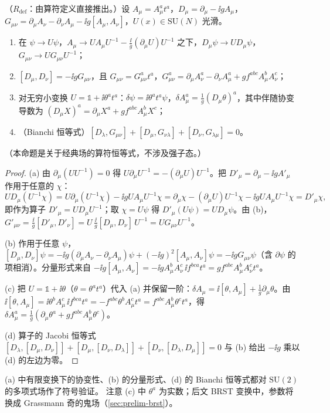 \begin{proposition}\label{prop:qcd-covariance}
（$R_{\mathrm{def}}$：由算符定义直接推出。）设 $A_\mu=A^a_\mu t^a$，$D_\mu=\partial_\mu-\ii gA_\mu$，$G_{\mu\nu}=\partial_\mu A_\nu-\partial_\nu A_\mu-\ii g[A_\mu,A_\nu]$，$U(x)\in\mathrm{SU}(N)$ 光滑。%
\begin{enumerate}[label=(\alph*),leftmargin=2.2em,itemsep=1pt,topsep=2pt]
\item 在 $\psi\to U\psi$，$A_\mu\to UA_\mu U^{-1}-\frac{\ii}g(\partial_\mu U)U^{-1}$ 之下，$D_\mu\psi\to UD_\mu\psi$，$G_{\mu\nu}\to UG_{\mu\nu}U^{-1}$；
\item $[D_\mu,D_\nu]=-\ii gG_{\mu\nu}$，且 $G_{\mu\nu}=G^a_{\mu\nu}t^a$，$G^a_{\mu\nu}=\partial_\mu A^a_\nu-\partial_\nu A^a_\mu+gf^{abc}A^b_\mu A^c_\nu$；
\item 对无穷小变换 $U=\mathbb 1+\ii\theta^at^a$：$\delta\psi=\ii\theta^at^a\psi$，$\delta A^a_\mu=\frac1g(D_\mu\theta)^a$，其中伴随协变导数为 $(D_\mu X)^a=\partial_\mu X^a+gf^{abc}A^b_\mu X^c$；
\item（Bianchi 恒等式）$[D_\lambda,G_{\mu\nu}]+[D_\mu,G_{\nu\lambda}]+[D_\nu,G_{\lambda\mu}]=0$。
\end{enumerate}
（本命题是关于经典场的算符恒等式，不涉及强子态。）
\end{proposition}

\begin{proof}
(a) 由 $\partial_\mu(UU^{-1})=0$ 得 $U\partial_\mu U^{-1}=-(\partial_\mu U)U^{-1}$。把 $D'_\mu=\partial_\mu-\ii gA'_\mu$ 作用于任意的 $\chi$：
\[
UD_\mu(U^{-1}\chi)=U\partial_\mu(U^{-1}\chi)-\ii gUA_\mu U^{-1}\chi=\partial_\mu\chi-(\partial_\mu U)U^{-1}\chi-\ii gUA_\mu U^{-1}\chi=D'_\mu\chi ,
\]
即作为算子 $D'_\mu=UD_\mu U^{-1}$；取 $\chi=U\psi$ 得 $D'_\mu(U\psi)=UD_\mu\psi$。由 (b)，$G'_{\mu\nu}=\frac{\ii}g[D'_\mu,D'_\nu]=U\,\frac{\ii}g[D_\mu,D_\nu]\,U^{-1}=UG_{\mu\nu}U^{-1}$。

(b) 作用于任意 $\psi$，$[D_\mu,D_\nu]\psi=-\ii g(\partial_\mu A_\nu-\partial_\nu A_\mu)\psi+(-\ii g)^2[A_\mu,A_\nu]\psi=-\ii gG_{\mu\nu}\psi$（含 $\partial\psi$ 的项相消）。分量形式来自 $-\ii g[A_\mu,A_\nu]=-\ii gA^b_\mu A^c_\nu\,\ii f^{bca}t^a=gf^{abc}A^b_\mu A^c_\nu t^a$。

(c) 把 $U=\mathbb 1+\ii\theta$（$\theta=\theta^at^a$）代入 (a) 并保留一阶：$\delta A_\mu=\ii[\theta,A_\mu]+\frac1g\partial_\mu\theta$。由 $\ii[\theta,A_\mu]=\ii\theta^bA^c_\mu\,\ii f^{bca}t^a=-f^{abc}\theta^bA^c_\mu t^a=f^{abc}A^b_\mu\theta^ct^a$，得 $\delta A^a_\mu=\frac1g(\partial_\mu\theta^a+gf^{abc}A^b_\mu\theta^c)$。

(d) 算子的 Jacobi 恒等式 $[D_\lambda,[D_\mu,D_\nu]]+[D_\mu,[D_\nu,D_\lambda]]+[D_\nu,[D_\lambda,D_\mu]]=0$ 与 (b) 给出 $-\ii g$ 乘以 (d) 的左边为零。
\end{proof}

(a) 中有限变换下的协变性、(b) 的分量形式、(d) 的 Bianchi 恒等式都对 $\mathrm{SU}(2)$ 的多项式场作了符号验证。%
注意 (c) 中 $\theta^a$ 为实数；后文 BRST 变换中，参数将换成 Grassmann 奇的鬼场（\cref{sec:prelim-brst}）。

